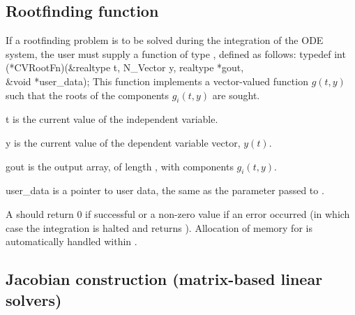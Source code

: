 \subsection{Rootfinding function}\label{ss:rootFn}
If a rootfinding problem is to be solved during the integration of the ODE system,
the user must supply a {\CC} function of type , defined as follows:
{
  typedef int (*CVRootFn)(&realtype t, N\_Vector y, realtype *gout, \\
                          &void *user\_data);
}
{
  This function implements a vector-valued function $g(t,y)$ such that the roots of
  the  components $g_i(t,y)$ are sought.
}
{
  \begin{args}
  \item[t]
    is the current value of the independent variable.
  \item[y]
    is the current value of the dependent variable vector, $y(t)$.
  \item[gout]
    is the output array, of length , with components $g_i(t,y)$.
  \item[user\_data]
    is a pointer to user data, the same as the 
    parameter passed to .
  \end{args}
}
{
  A  should return 0 if successful or a non-zero value if
  an error occurred (in which case the integration is halted and  returns
  ).
}
{
  Allocation of memory for  is automatically handled within {\cvodes}.
}


\subsection{Jacobian construction (matrix-based linear solvers)}
\label{ss:jacFn}


